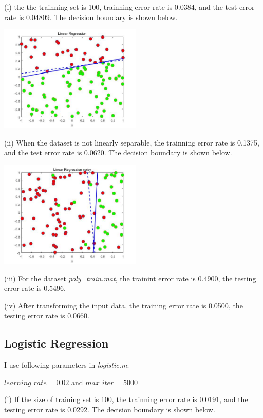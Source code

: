 \documentclass[11pt]{article} %
\begin{document}
(i) the the trainning set is 100, trainning error rate is 0.0384, and the test error rate is 0.04809. The decision boundary is shown below.

\begin{center}
\includegraphics[height=2in]{./LinearReg_i.jpg}
\end{center}

(ii) When the dataset is not linearly separable, the trainning error rate is 0.1375, and the test error rate is 0.0620. The decision boundary is shown below.

\begin{center}
\includegraphics[height=2in]{./LinearReg_ii.jpg}
\end{center}

(iii) For the dataset \emph{poly\_train.mat}, the trainint error rate is 0.4900, the testing error rate is 0.5496.

(iv) After transforming the input data, the training error rate is 0.0500, the testing error rate is 0.0660.

\subsection{Logistic Regression}

I use following parameters in \emph{logistic.m}:

$learning\_rate = 0.02$ and 
$max\_iter = 5000$

(i) If the size of training set is 100, the trainning error rate is 0.0191, and the testing error rate is 0.0292. The decision boundary is shown below.
\end{document}
